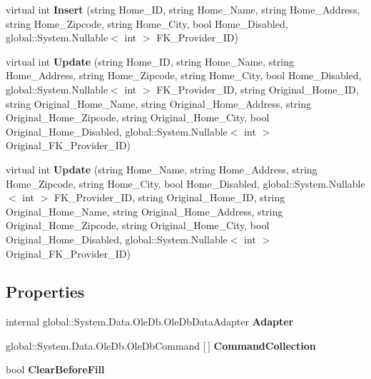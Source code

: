 \begin{DoxyCompactItemize}
virtual int {\bfseries Insert} (string Home\+\_\+\+ID, string Home\+\_\+\+Name, string Home\+\_\+\+Address, string Home\+\_\+\+Zipcode, string Home\+\_\+\+City, bool Home\+\_\+\+Disabled, global\+::\+System.\+Nullable$<$ int $>$ F\+K\+\_\+\+Provider\+\_\+\+ID)
\item 
\mbox{\label{class_a_f_h___scheduler_1_1_home_inspection_db_data_set_table_adapters_1_1_home_table_adapter_a8fa98f0a23bedccc43a39e46864b9db6}} 
virtual int {\bfseries Update} (string Home\+\_\+\+ID, string Home\+\_\+\+Name, string Home\+\_\+\+Address, string Home\+\_\+\+Zipcode, string Home\+\_\+\+City, bool Home\+\_\+\+Disabled, global\+::\+System.\+Nullable$<$ int $>$ F\+K\+\_\+\+Provider\+\_\+\+ID, string Original\+\_\+\+Home\+\_\+\+ID, string Original\+\_\+\+Home\+\_\+\+Name, string Original\+\_\+\+Home\+\_\+\+Address, string Original\+\_\+\+Home\+\_\+\+Zipcode, string Original\+\_\+\+Home\+\_\+\+City, bool Original\+\_\+\+Home\+\_\+\+Disabled, global\+::\+System.\+Nullable$<$ int $>$ Original\+\_\+\+F\+K\+\_\+\+Provider\+\_\+\+ID)
\item 
\mbox{\label{class_a_f_h___scheduler_1_1_home_inspection_db_data_set_table_adapters_1_1_home_table_adapter_a151f1bf6de8df30e5621c06abeb02752}} 
virtual int {\bfseries Update} (string Home\+\_\+\+Name, string Home\+\_\+\+Address, string Home\+\_\+\+Zipcode, string Home\+\_\+\+City, bool Home\+\_\+\+Disabled, global\+::\+System.\+Nullable$<$ int $>$ F\+K\+\_\+\+Provider\+\_\+\+ID, string Original\+\_\+\+Home\+\_\+\+ID, string Original\+\_\+\+Home\+\_\+\+Name, string Original\+\_\+\+Home\+\_\+\+Address, string Original\+\_\+\+Home\+\_\+\+Zipcode, string Original\+\_\+\+Home\+\_\+\+City, bool Original\+\_\+\+Home\+\_\+\+Disabled, global\+::\+System.\+Nullable$<$ int $>$ Original\+\_\+\+F\+K\+\_\+\+Provider\+\_\+\+ID)
\end{DoxyCompactItemize}
\subsection*{Properties}
\begin{DoxyCompactItemize}
\item 
\mbox{\label{class_a_f_h___scheduler_1_1_home_inspection_db_data_set_table_adapters_1_1_home_table_adapter_afeb12064b1815fd65bb9cdceddd3f6e3}} 
internal global\+::\+System.\+Data.\+Ole\+Db.\+Ole\+Db\+Data\+Adapter {\bfseries Adapter}\hspace{0.3cm}{\ttfamily  [get]}
\item 
\mbox{\label{class_a_f_h___scheduler_1_1_home_inspection_db_data_set_table_adapters_1_1_home_table_adapter_aeff208d1aadab9301b466a6d98eaf186}} 
global\+::\+System.\+Data.\+Ole\+Db.\+Ole\+Db\+Command [$\,$] {\bfseries Command\+Collection}\hspace{0.3cm}{\ttfamily  [get]}
\item 
\mbox{\label{class_a_f_h___scheduler_1_1_home_inspection_db_data_set_table_adapters_1_1_home_table_adapter_a9819c4b1c79cf2605418caef5271c81a}} 
bool {\bfseries Clear\+Before\+Fill}\hspace{0.3cm}{\ttfamily  [get, set]}
\end{DoxyCompactItemize}


